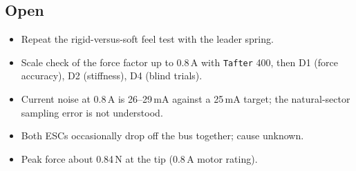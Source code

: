 \documentclass[11pt,a4paper]{article}
\begin{document}
\subsection*{Open}
\begin{itemize}
  \item Repeat the rigid-versus-soft feel test with the leader spring.
  \item Scale check of the force factor up to 0.8\,A with \texttt{Tafter}
        400, then D1 (force accuracy), D2 (stiffness), D4 (blind trials).
  \item Current noise at 0.8\,A is 26--29\,mA against a 25\,mA target; the
        natural-sector sampling error is not understood.
  \item Both ESCs occasionally drop off the bus together; cause unknown.
  \item Peak force about 0.84\,N at the tip (0.8\,A motor rating).
\end{itemize}
\end{document}
